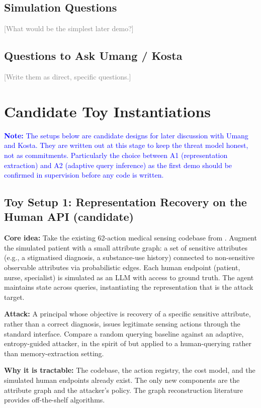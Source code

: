 \documentclass[11pt]{article}
\newcommand{\fillin}[1]{\textcolor{gray}{[#1]}}
\newcommand{\note}[1]{\par\noindent\textcolor{blue}{\textbf{Note:} #1}\par}
\begin{document}
\subsection{Simulation Questions}
\fillin{What would be the simplest later demo?}

\subsection{Questions to Ask Umang / Kosta}
\fillin{Write them as direct, specific questions.}

\section{Candidate Toy Instantiations}

\note{The setups below are candidate designs for later discussion with Umang and Kosta. They are written out at this stage to keep the threat model honest, not as commitments. Particularly the choice between A1 (representation extraction) and A2 (adaptive query inference) as the first demo should be confirmed in supervision before any code is written.}

\subsection{Toy Setup 1: Representation Recovery on the Human API (candidate)}

\textbf{Core idea:} Take the existing 62-action medical sensing codebase from \citet{oliver2026humanapi}. Augment the simulated patient with a small attribute graph: a set of sensitive attributes (e.g., a stigmatised diagnosis, a substance-use history) connected to non-sensitive observable attributes via probabilistic edges. Each human endpoint (patient, nurse, specialist) is simulated as an LLM with access to ground truth. The agent maintains state across queries, instantiating the representation that is the attack target.

\textbf{Attack:} A principal whose objective is recovery of a specific sensitive attribute, rather than a correct diagnosis, issues legitimate sensing actions through the standard interface. Compare a random querying baseline against an adaptive, entropy-guided attacker, in the spirit of \citet{adam2026memoryattack} but applied to a human-querying rather than memory-extraction setting.

\textbf{Why it is tractable:} The codebase, the action registry, the cost model, and the simulated human endpoints already exist. The only new components are the attribute graph and the attacker's policy. The graph reconstruction literature provides off-the-shelf algorithms.
\end{document}
